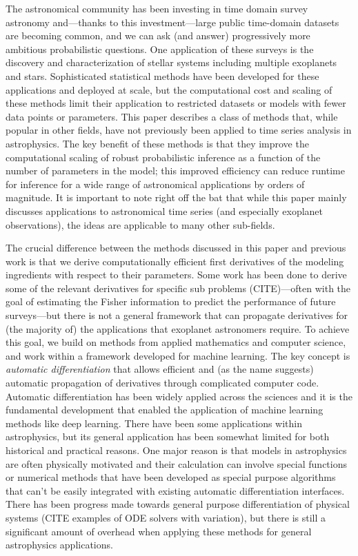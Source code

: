 \documentclass[modern]{aastex62}
\begin{document}
The astronomical community has been investing in time domain survey astronomy and---thanks to this investment---large public time-domain datasets are becoming common, and we can ask (and answer) progressively more ambitious probabilistic questions.
One application of these surveys is the discovery and characterization of stellar systems including multiple exoplanets and stars.
Sophisticated statistical methods have been developed for these applications and deployed at scale, but the computational cost and scaling of these methods limit their application to restricted datasets or models with fewer data points or parameters.
This paper describes a class of methods that, while popular in other fields, have not previously been applied to time series analysis in astrophysics.
The key benefit of these methods is that they improve the computational scaling of robust probabilistic inference as a function of the number of parameters in the model; this improved efficiency can reduce runtime for inference for a wide range of astronomical applications by orders of magnitude.
It is important to note right off the bat that while this paper mainly discusses applications to astronomical time series (and especially exoplanet observations), the ideas are applicable to many other sub-fields.

The crucial difference between the methods discussed in this paper and previous work is that we derive computationally efficient first derivatives of the modeling ingredients with respect to their parameters.
Some work has been done to derive some of the relevant derivatives for specific sub problems (CITE)---often with the goal of estimating the Fisher information to predict the performance of future surveys---but there is not a general framework that can propagate derivatives for (the majority of) the applications that exoplanet astronomers require.
To achieve this goal, we build on methods from applied mathematics and computer science, and work within a framework developed for machine learning.
The key concept is \emph{automatic differentiation} that allows efficient and (as the name suggests) automatic propagation of derivatives through complicated computer code.
Automatic differentiation has been widely applied across the sciences and it is the fundamental development that enabled the application of machine learning methods like deep learning.
There have been some applications within astrophysics, but its general application has been somewhat limited for both historical and practical reasons.
One major reason is that models in astrophysics are often physically motivated and their calculation can involve special functions or numerical methods that have been developed as special purpose algorithms that can't be easily integrated with existing automatic differentiation interfaces.
There has been progress made towards general purpose differentiation of physical systems (CITE examples of ODE solvers with variation), but there is still a significant amount of overhead when applying these methods for general astrophysics applications.
\end{document}
